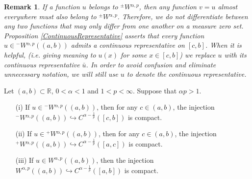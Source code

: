 \documentclass[leqno,final]{siamltex}
\numberwithin{equation}{section}
\newtheorem{remark}{Remark}[section]
\renewcommand{\(}{\bigl(}
\renewcommand{\)}{\bigr)}
\newcommand{\R}{\mathbb{R}}
\begin{document}
    \begin{remark}
        If a function $u$ belongs to ${^{\pm}}{W}{^{\alpha,p}}$, then any function $v = u$ almost everywhere must also belong to ${^{\pm}}{W}{^{\alpha,p}}$. Therefore, we do not differentiate between any two functions that may only differ from one another on a measure zero set. Proposition \ref{ContinuousRepresentative} asserts that every function $u \in {^{-}}{W}{^{\alpha,p}}((a,b))$ admits a continuous representative on $[c,b]$. When it is helpful, (i.e. giving meaning to $u(x)$ for some $x \in [c,b]$) we replace $u$ with its continuous representative $\bar{u}$. In order to avoid confusion and eliminate unnecessary notation, we will still use $u$ to denote the continuous representative.
    \end{remark}
    
    
     \begin{theorem}\label{CompactEmbedding}
    	Let $(a,b) \subset \R$, $0 < \alpha <1$ and $1 < p < \infty$. Suppose that $\alpha p >1$. 
    	\begin{itemize}
    		\item[{\rm (i)}] If $u \in {^{-}}{W}{^{\alpha,p}}((a,b))$, then for any $c \in (a,b)$, 
    		the injection ${^{-}}{W}{^{\alpha,p}}((a,b)) \hookrightarrow C^{\alpha -\frac{1}{p}}([c,b])$
    		is compact. 
     
    		\item[{\rm (ii)}] If $u \in {^{+}}{W}{^{\alpha,p}}((a,b))$, then for any $c\in (a,b)$, the injection ${^{+}}{W}{^{\alpha,p}}((a,b)) \hookrightarrow C^{\alpha -\frac{1}{p}}([a,c])$
    		is compact. 
    		
    		\item[{\rm (iii)}] If $u \in W^{\alpha,p}((a,b))$, then the injection $W^{\alpha,p}((a,b)) \hookrightarrow C^{\alpha -\frac{1}{p}}([a,b])$ is compact. 
    	\end{itemize}
        
    \end{theorem}
    
\end{document}
